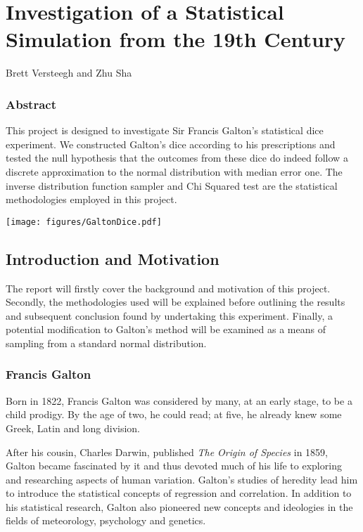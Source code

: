 \section{Investigation of a Statistical Simulation from the 19th Century}
\begin{center}
Brett Versteegh and Zhu Sha
\end{center}
\subsubsection*{Abstract}
This project is designed to investigate Sir Francis Galton's statistical dice experiment. We constructed Galton's dice according to his prescriptions and tested the null hypothesis that the outcomes from these dice do indeed follow a discrete approximation to the normal distribution with median error one. The inverse distribution function sampler and Chi Squared test are the statistical methodologies employed in this project.

\begin{center}
\texttt{[image: figures/GaltonDice.pdf]}
\end{center}

\subsection{Introduction and Motivation}
The report will firstly cover the background and motivation of this project. Secondly, the methodologies used will be explained before outlining the results and subsequent conclusion found by undertaking this experiment. Finally, a potential modification to Galton's method will be examined as a means of sampling from a standard normal distribution.  

\subsubsection*{Francis Galton}
Born in 1822, Francis Galton was considered by many, at an early stage, to be a child prodigy. By the age of two, he could read; at five, he already knew some Greek, Latin and long division.

After his cousin, Charles Darwin, published \textit{The Origin of Species} in 1859, Galton became fascinated by it and thus devoted much of his life to exploring and researching aspects of human variation. Galton's studies of heredity lead him to introduce the statistical concepts of regression and correlation. In addition to his statistical research, Galton also pioneered new concepts and ideologies in the fields of meteorology, psychology and genetics.  

